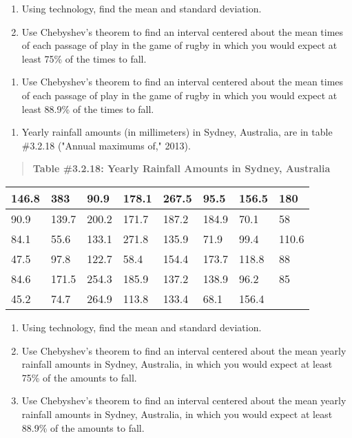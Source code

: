 \documentclass[]{book}
\providecommand{\tightlist}{%
  \setlength{\itemsep}{0pt}\setlength{\parskip}{0pt}}
\begin{document}
\begin{enumerate}
\def\labelenumi{\alph{enumi}.}
\item
  Using technology, find the mean and standard deviation.
\item
  Use Chebyshev's theorem to find an interval centered about the mean
  times of each passage of play in the game of rugby in which you
  would expect at least 75\% of the times to fall.
\end{enumerate}

\begin{enumerate}
\def\labelenumi{\alph{enumi}.}
\setcounter{enumi}{2}
\tightlist
\item
  Use Chebyshev's theorem to find an interval centered about the mean
  times of each passage of play in the game of rugby in which you
  would expect at least 88.9\% of the times to fall.
\end{enumerate}

\begin{enumerate}
\def\labelenumi{\arabic{enumi}.}
\setcounter{enumi}{11}
\tightlist
\item
  Yearly rainfall amounts (in millimeters) in Sydney, Australia, are
  in table \#3.2.18 ("Annual maximums of," 2013).
\end{enumerate}

\begin{quote}
\textbf{Table \#3.2.18: Yearly Rainfall Amounts in Sydney, Australia}
\end{quote}

\begin{longtable}[]{@{}llllllll@{}}
\toprule
146.8 & 383 & 90.9 & 178.1 & 267.5 & 95.5 & 156.5 & 180\tabularnewline
\midrule
\endhead
90.9 & 139.7 & 200.2 & 171.7 & 187.2 & 184.9 & 70.1 & 58\tabularnewline
84.1 & 55.6 & 133.1 & 271.8 & 135.9 & 71.9 & 99.4 & 110.6\tabularnewline
47.5 & 97.8 & 122.7 & 58.4 & 154.4 & 173.7 & 118.8 & 88\tabularnewline
84.6 & 171.5 & 254.3 & 185.9 & 137.2 & 138.9 & 96.2 & 85\tabularnewline
45.2 & 74.7 & 264.9 & 113.8 & 133.4 & 68.1 & 156.4 &\tabularnewline
\bottomrule
\end{longtable}

\begin{enumerate}
\def\labelenumi{\alph{enumi}.}
\item
  Using technology, find the mean and standard deviation.
\item
  Use Chebyshev's theorem to find an interval centered about the mean
  yearly rainfall amounts in Sydney, Australia, in which you would
  expect at least 75\% of the amounts to fall.
\item
  Use Chebyshev's theorem to find an interval centered about the mean
  yearly rainfall amounts in Sydney, Australia, in which you would
  expect at least 88.9\% of the amounts to fall.
\end{enumerate}
\end{document}
